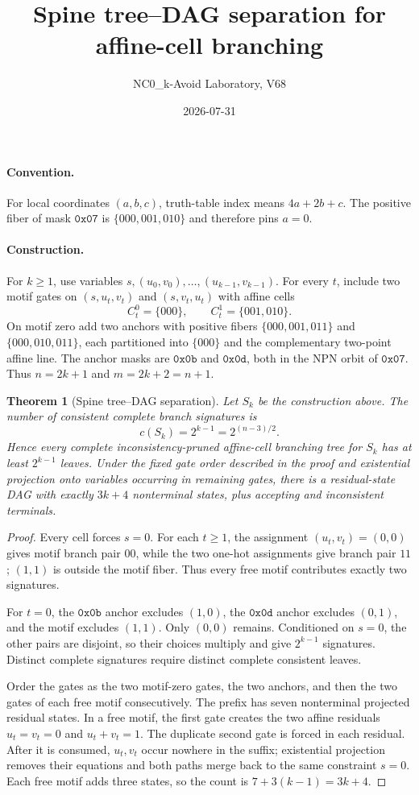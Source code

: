 \documentclass[11pt]{article}
\title{Spine tree--DAG separation for affine-cell branching}
\author{NC0\_k-Avoid Laboratory, V68}
\date{2026-07-31}
\newtheorem{theorem}{Theorem}
\begin{document}
\maketitle

\paragraph{Convention.}
For local coordinates $(a,b,c)$, truth-table index means $4a+2b+c$.
The positive fiber of mask $\mathtt{0x07}$ is
$\{000,001,010\}$ and therefore pins $a=0$.

\paragraph{Construction.}
For $k\geq 1$, use variables
$s,(u_0,v_0),\ldots,(u_{k-1},v_{k-1})$.
For every $t$, include two motif gates on $(s,u_t,v_t)$ and
$(s,v_t,u_t)$ with affine cells
\[
 C^0_t=\{000\},\qquad C^1_t=\{001,010\}.
\]
On motif zero add two anchors with positive fibers
$\{000,001,011\}$ and $\{000,010,011\}$, each partitioned into
$\{000\}$ and the complementary two-point affine line.
The anchor masks are $\mathtt{0x0b}$ and $\mathtt{0x0d}$, both in the NPN
orbit of $\mathtt{0x07}$.
Thus $n=2k+1$ and $m=2k+2=n+1$.

\begin{theorem}[Spine tree--DAG separation]
Let $S_k$ be the construction above.
The number of consistent complete branch signatures is
\[
 c(S_k)=2^{k-1}=2^{(n-3)/2}.
\]
Hence every complete inconsistency-pruned affine-cell branching tree for
$S_k$ has at least $2^{k-1}$ leaves.
Under the fixed gate order described in the proof and existential projection
onto variables occurring in remaining gates, there is a residual-state DAG
with exactly $3k+4$ nonterminal states, plus accepting and inconsistent
terminals.
\end{theorem}

\begin{proof}
Every cell forces $s=0$.  For each $t\geq1$, the assignment
$(u_t,v_t)=(0,0)$ gives motif branch pair $00$, while the two one-hot
assignments give branch pair $11$; $(1,1)$ is outside the motif fiber.
Thus every free motif contributes exactly two signatures.

For $t=0$, the $\mathtt{0x0b}$ anchor excludes $(1,0)$, the
$\mathtt{0x0d}$ anchor excludes $(0,1)$, and the motif excludes $(1,1)$.
Only $(0,0)$ remains.  Conditioned on $s=0$, the other pairs are disjoint,
so their choices multiply and give $2^{k-1}$ signatures.  Distinct complete
signatures require distinct complete consistent leaves.

Order the gates as the two motif-zero gates, the two anchors, and then the two
gates of each free motif consecutively.  The prefix has seven nonterminal
projected residual states.  In a free motif, the first gate creates the two
affine residuals $u_t=v_t=0$ and $u_t+v_t=1$.  The duplicate second gate is
forced in each residual.  After it is consumed, $u_t,v_t$ occur nowhere in
the suffix; existential projection removes their equations and both paths
merge back to the same constraint $s=0$.  Each free motif adds three states,
so the count is $7+3(k-1)=3k+4$.
\end{proof}
\end{document}
